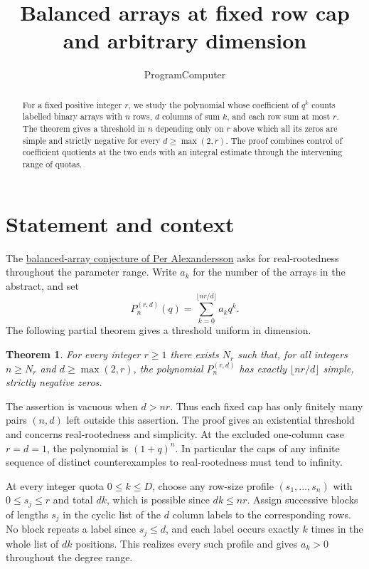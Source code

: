 \documentclass[11pt]{article}
\title{Balanced arrays at fixed row cap and arbitrary dimension}
\author{ProgramComputer}
\date{}
\newtheorem{theorem}{Theorem}
\begin{document}
\maketitle

\begin{abstract}
For a fixed positive integer $r$, we study the polynomial whose
coefficient of $q^k$ counts labelled binary arrays with $n$ rows,
$d$ columns of sum $k$, and each row sum at most $r$.
The theorem gives a threshold in $n$ depending only on $r$
above which all its zeros are simple and strictly negative for every
$d\ge\max(2,r)$. The proof combines control of coefficient quotients
at the two ends with an integral estimate through the intervening
range of quotas.
\end{abstract}

\section{Statement and context}
The \href{https://www.symmetricfunctions.com/realRootedOpenProblems.htm\#conjBalancedArrays}{balanced-array conjecture of Per Alexandersson}
asks for real-rootedness throughout the parameter range.
Write $a_k$ for the number of the arrays in the abstract, and set
\[
  P_n^{(r,d)}(q)=\sum_{k=0}^{\lfloor nr/d\rfloor}a_kq^k.
\]
The following partial theorem gives a threshold uniform in dimension.
\begin{theorem}
For every integer $r\ge1$ there exists $N_r$ such that, for all integers
$n\ge N_r$ and $d\ge\max(2,r)$, the polynomial $P_n^{(r,d)}$ has exactly
$\lfloor nr/d\rfloor$ simple, strictly negative zeros.
\end{theorem}

The assertion is vacuous when $d>nr$. Thus each fixed cap has only
finitely many pairs $(n,d)$ left outside this assertion. The proof
gives an existential threshold and concerns real-rootedness and simplicity.
At the excluded one-column case $r=d=1$, the polynomial is $(1+q)^n$.
In particular the caps of any infinite sequence of distinct
counterexamples to real-rootedness must tend to infinity.

At every integer quota $0\le k\le D$, choose any row-size profile $(s_1,\dots,s_n)$ with $0\le s_j\le r$ and total $dk$, which is possible since $dk\le nr$. Assign successive blocks of lengths $s_j$ in the cyclic list of the $d$ column labels to the corresponding rows. No block repeats a label since $s_j\le d$, and each label occurs exactly $k$ times in the whole list of $dk$ positions. This realizes every such profile and gives $a_k>0$ throughout the degree range.



\appendix
\clearpage





\end{document}
